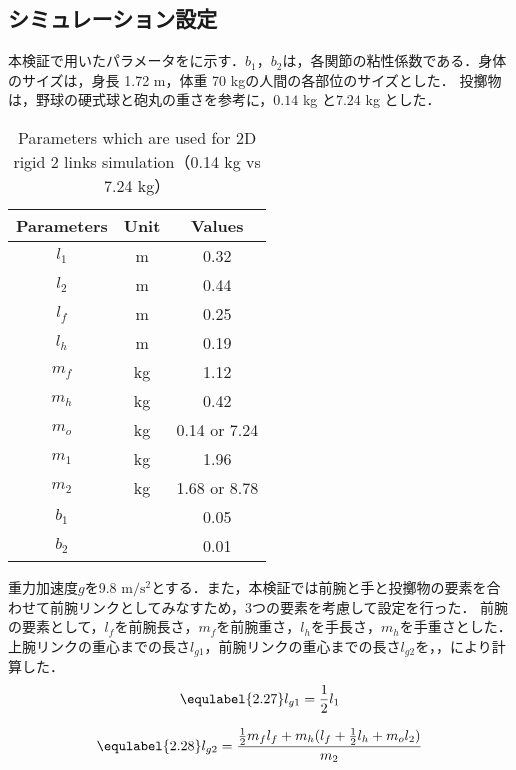 \subsection{シミュレーション設定}
本検証で用いたパラメータをに示す\cite{irving}．$b_{1}$，$b_{2}$は，各関節の粘性係数である．身体のサイズは，身長 1.72 m，体重 70 kgの人間の各部位のサイズとした．
投擲物は，野球の硬式球と砲丸の重さを参考に，$0.14$ kg\cite{horiuchi} と$7.24$ kg\cite{haq} とした．
\begin{table}[tb]
  \begin{center}
    \caption{Parameters which are used for 2D rigid 2 links simulation（0.14 kg vs 7.24 kg）}
    \begin{tabular}{c|c|c}
      \hline
      Parameters & Unit & Values \\
      \hline
      $l_{1}$ & m & 0.32 \\
      $l_{2}$ & m & 0.44 \\
      $l_{f}$ & m & 0.25 \\
      $l_{h}$ & m & 0.19 \\
      $m_{f}$ & kg & 1.12 \\
      $m_{h}$ & kg & 0.42 \\
      $m_{o}$ & kg & 0.14 or 7.24 \\
      $m_{1}$ & kg & 1.96 \\
      $m_{2}$ & kg & 1.68 or 8.78 \\
      $b_{1}$ &  & 0.05 \\
      $b_{2}$ &  & 0.01 \\
      \hline
    \end{tabular}
  \end{center}
\end{table}
重力加速度$g$を9.8 $\mathrm{m/s^{2}}$とする．また，本検証では前腕と手と投擲物の要素を合わせて前腕リンクとしてみなすため，3つの要素を考慮して設定を行った．
前腕の要素として，$l_{f}$を前腕長さ，$m_{f}$を前腕重さ，$l_{h}$を手長さ，$m_{h}$を手重さとした．\\
上腕リンクの重心までの長さ$l_{g1}$，前腕リンクの重心までの長さ$l_{g2}$を，，により計算した．
\begin{eqnarray}
  \equlabel{2.27}
  l_{g1}=\frac{1}{2}l_{1}
\end{eqnarray}

\begin{eqnarray}
  \equlabel{2.28}
  l_{g2}=\frac{\frac{1}{2}m_{f}l_{f}+m_{h}(l_{f}+\frac{1}{2}l_{h}+m_{o}l_{2})}{m_{2}}
\end{eqnarray}

